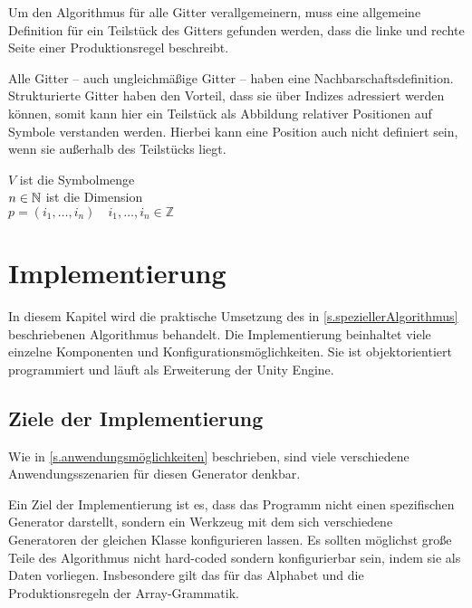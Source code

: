 Um den Algorithmus für alle Gitter verallgemeinern, muss eine allgemeine Definition für ein Teilstück des Gitters gefunden werden, dass die linke und rechte Seite einer Produktionsregel beschreibt. 

Alle Gitter -- auch ungleichmäßige Gitter -- haben eine Nachbarschaftsdefinition. Strukturierte Gitter haben den Vorteil, dass sie über Indizes adressiert werden können, somit kann hier ein Teilstück als Abbildung relativer Positionen auf Symbole verstanden werden. Hierbei kann eine Position auch nicht definiert sein, wenn sie außerhalb des Teilstücks liegt.

$ V $ ist die Symbolmenge \\
$ n \in \mathbb{N} $ ist die Dimension \\
$ p = (i_1, \dotsc , i_n) \quad i_1, \dotsc , i_n \in \mathbb{Z} $


\chapter{Implementierung}\label{c.implementierung}

In diesem Kapitel wird die praktische Umsetzung des in \ref{s.speziellerAlgorithmus} beschriebenen Algorithmus behandelt. Die Implementierung beinhaltet viele einzelne Komponenten und Konfigurationsmöglichkeiten. Sie ist objektorientiert programmiert und läuft als Erweiterung der Unity Engine. 



\section{Ziele der Implementierung}

Wie in \ref{s.anwendungsmöglichkeiten} beschrieben, sind viele verschiedene Anwendungsszenarien für diesen Generator denkbar. 

Ein Ziel der Implementierung ist es, dass das Programm nicht einen spezifischen Generator darstellt, sondern ein Werkzeug mit dem sich verschiedene Generatoren der gleichen Klasse konfigurieren lassen. Es sollten möglichst große Teile des Algorithmus nicht hard-coded sondern konfigurierbar sein, indem sie als Daten vorliegen. Insbesondere gilt das für das Alphabet und die Produktionsregeln der Array-Grammatik.

